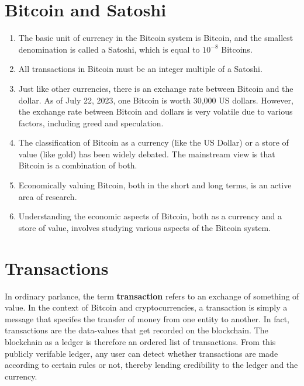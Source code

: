 \documentclass{report}
\begin{document}
\section{Bitcoin and Satoshi}
\begin{enumerate}
	\item The basic unit of currency in the Bitcoin system is Bitcoin, and the smallest denomination is called a Satoshi, which is equal to $10^{-8}$ Bitcoins.
	\item All transactions in Bitcoin must be an integer multiple of a Satoshi.
	\item Just like other currencies, there is an exchange rate between Bitcoin and the dollar. As of July 22, 2023, one Bitcoin is worth 30,000 US dollars. However, the exchange rate between Bitcoin and dollars is very volatile due to various factors, including greed and speculation.
	\item The classification of Bitcoin as a currency (like the US Dollar) or a store of value (like gold) has been widely debated. The mainstream view is that Bitcoin is a combination of both.
	\item Economically valuing Bitcoin, both in the short and long terms, is an active area of research.
	\item Understanding the economic aspects of Bitcoin, both as a currency and a store of value, involves studying various aspects of the Bitcoin system.
\end{enumerate}

\section{Transactions}
In ordinary parlance, the term \textbf{transaction} refers to an exchange of something of value. In the context of Bitcoin and cryptocurrencies, a transaction is simply a message that specifes the transfer of money from one entity to another. In fact, transactions are the data-values that get recorded on the blockchain. The blockchain as a ledger is therefore an ordered list of transactions. From this publicly verifable ledger, any user can detect whether transactions are made according to certain rules or not, thereby lending credibility to the ledger and the currency.
\end{document}
